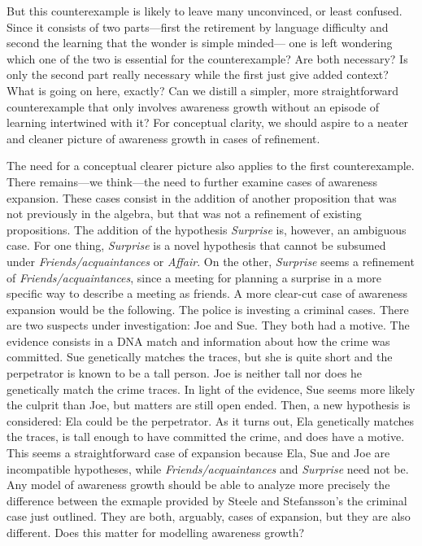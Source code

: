 \documentclass[
  11pt,
  dvipsnames,enabledeprecatedfontcommands]{scrartcl}
\begin{document}
But this counterexample is likely to leave many unconvinced, or least
confused. Since it consists of two parts---first the retirement by
language difficulty and second the learning that the wonder is simple
minded--- one is left wondering which one of the two is essential for
the counterexample? Are both necessary? Is only the second part really
necessary while the first just give added context? What is going on
here, exactly? Can we distill a simpler, more straightforward
counterexample that only involves awareness growth without an episode of
learning intertwined with it? For conceptual clarity, we should aspire
to a neater and cleaner picture of awareness growth in cases of
refinement.

The need for a conceptual clearer picture also applies to the first
counterexample. There remains---we think---the need to further examine
cases of awareness expansion. These cases consist in the addition of
another proposition that was not previously in the algebra, but that was
not a refinement of existing propositions. The addition of the
hypothesis \textit{Surprise} is, however, an ambiguous case. For one
thing, \textit{Surprise} is a novel hypothesis that cannot be subsumed
under \textit{Friends/acquaintances} or \textit{Affair}. On the other,
\textit{Surprise} seems a refinement of \textit{Friends/acquaintances},
since a meeting for planning a surprise in a more specific way to
describe a meeting as friends. A more clear-cut case of awareness
expansion would be the following. The police is investing a criminal
cases. There are two suspects under investigation: Joe and Sue. They
both had a motive. The evidence consists in a DNA match and information
about how the crime was committed. Sue genetically matches the traces,
but she is quite short and the perpetrator is known to be a tall person.
Joe is neither tall nor does he genetically match the crime traces. In
light of the evidence, Sue seems more likely the culprit than Joe, but
matters are still open ended. Then, a new hypothesis is considered: Ela
could be the perpetrator. As it turns out, Ela genetically matches the
traces, is tall enough to have committed the crime, and does have a
motive. This seems a straightforward case of expansion because Ela, Sue
and Joe are incompatible hypotheses, while
\textit{Friends/acquaintances} and \textit{Surprise} need not be. Any
model of awareness growth should be able to analyze more precisely the
difference between the exmaple provided by Steele and Stefansson's the
criminal case just outlined. They are both, arguably, cases of
expansion, but they are also different. Does this matter for modelling
awareness growth?
\end{document}
